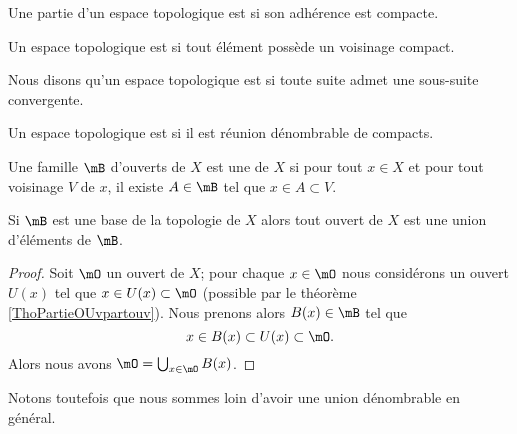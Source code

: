 \begin{definition}
    Une partie d'un espace topologique est  si son adhérence est compacte.
\end{definition}

\begin{definition}  \label{DefEIBYooAWoESf}
    Un espace topologique est  si tout élément possède un voisinage compact.
\end{definition}

\begin{definition}
    Nous disons qu'un espace topologique est  si toute suite admet une sous-suite convergente.
\end{definition}

\begin{definition}      \label{DefFCGBooLpnSAK}
    Un espace topologique est  si il est réunion dénombrable de compacts.
\end{definition}

\begin{definition}   \label{DefQELfbBEyiB}
    Une famille \( \mB\) d'ouverts de \( X\) est une  de \( X\) si pour tout \( x\in X\) et pour tout voisinage \( V\) de \( x\), il existe \( A\in \mB\) tel que \( x\in A\subset V\).
\end{definition}

\begin{proposition} \label{PropMMKBjgY}
    Si \( \mB\) est une base de la topologie de \( X\) alors tout ouvert de \( X\) est une union d'éléments de \( \mB\).
\end{proposition}

\begin{proof}
    Soit \( \mO\) un ouvert de \( X\); pour chaque \( x\in\mO\) nous considérons un ouvert \( U(x)\) tel que \( x\in U(x)\subset \mO\) (possible par le théorème \ref{ThoPartieOUvpartouv}). Nous prenons alors \( B(x)\in\mB\) tel que 
    \begin{equation}
        x\in B(x)\subset U(x)\subset \mO.
    \end{equation}
    Alors nous avons \( \mO=\bigcup_{x\in \mO}B(x)\).
\end{proof}
Notons toutefois que nous sommes loin d'avoir une union dénombrable en général.

